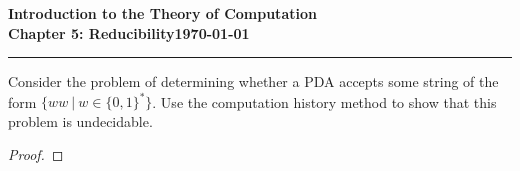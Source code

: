 \documentclass[11pt]{article}
\newcommand{\dated}{\today}
\begin{document}
\textbf{Introduction to the Theory of
Computation}\hfill\textbf{\myname}\\[0.01in]
\textbf{Chapter 5: Reducibility}\hfill\textbf{\dated}\\
\smallskip\hrule\bigskip

\begin{problem}{5.33}
Consider the problem of determining whether a PDA accepts some string of the
form $\{ww \ | \ w \in \{0,1\}^{*}\}$. Use the computation history method to show that this problem is undecidable.
\end{problem}

\begin{proof}
\end{proof}
\end{document}
